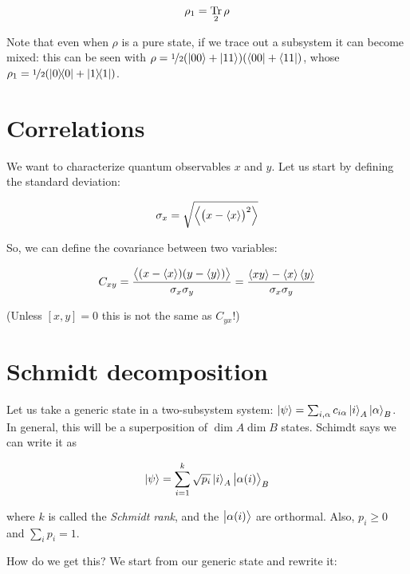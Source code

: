 \documentclass[main.tex]{subfiles}
\begin{document}
\begin{equation} \label{eq:reduced-density-matrix}
    \rho_1 = \operatorname*{Tr}_2 \rho
\end{equation}

Note that even when \(\rho\) is a pure state, if we trace out a subsystem it can become mixed: this can be seen with \(\rho = \frac[i]{1}{2} (\ket{00} + \ket{11})(\bra{00} + \bra{11})\), whose \(\rho_1 = \frac[i]{1}{2} (\dyad{0} + \dyad{1})\).

\section{Correlations}

We want to characterize quantum observables \(x\) and \(y\). Let us start by defining the standard deviation:

\begin{equation}
    \sigma_x = \sqrt{\expval{\qty(x - \expval{x} )^2}}
\end{equation}

So, we can define the covariance between two variables:

\begin{equation}
    C_{xy} = \frac{\expval{(x - \expval{x}) (y - \expval{y} )}}{\sigma_x \sigma_y}
    = \frac{\expval{xy} - \expval{x} \expval{y} }{\sigma_x \sigma_y}
\end{equation}

(Unless \([x,y]=0\) this is not the same as \(C_{yx}\)!)

\section{Schmidt decomposition}

Let us take a generic state in a two-subsystem system: \(\ket\psi = \sum _{i, \alpha} c_{i \alpha} \ket{i}_A \ket{ \alpha}_B \). In general, this will be a superposition of \(\dim A \dim B\) states. Schimdt  says we can write it as

\begin{equation}
    \ket{\psi}
    = \sum _{i=1} ^k \sqrt{p_i}  \ket{i}_A \ket{\alpha(i)} _B
\end{equation}

where \(k\) is called the \emph{Schmidt rank}, and the \(\ket{\alpha(i)} \) are orthormal. Also, \(p_i \geq 0\) and \(\sum _{i} p_i = 1 \).

How do we get this? We start from our generic state and rewrite it:
\end{document}
